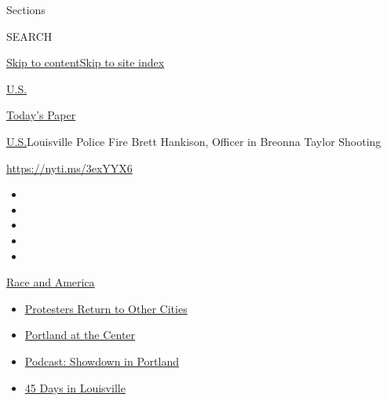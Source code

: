 Sections

SEARCH

\protect\hyperlink{site-content}{Skip to
content}\protect\hyperlink{site-index}{Skip to site index}

\href{https://www.nytimes3xbfgragh.onion/section/us}{U.S.}

\href{https://myaccount.nytimes3xbfgragh.onion/auth/login?response_type=cookie\&client_id=vi}{}

\href{https://www.nytimes3xbfgragh.onion/section/todayspaper}{Today's
Paper}

\href{/section/us}{U.S.}\textbar{}Louisville Police Fire Brett Hankison,
Officer in Breonna Taylor Shooting

\url{https://nyti.ms/3exYYX6}

\begin{itemize}
\item
\item
\item
\item
\item
\end{itemize}

\href{https://www.nytimes3xbfgragh.onion/news-event/george-floyd-protests-minneapolis-new-york-los-angeles?action=click\&pgtype=Article\&state=default\&region=TOP_BANNER\&context=storylines_menu}{Race
and America}

\begin{itemize}
\tightlist
\item
  \href{https://www.nytimes3xbfgragh.onion/2020/07/26/us/protests-portland-seattle-trump.html?action=click\&pgtype=Article\&state=default\&region=TOP_BANNER\&context=storylines_menu}{Protesters
  Return to Other Cities}
\item
  \href{https://www.nytimes3xbfgragh.onion/2020/07/24/us/portland-oregon-protests-white-race.html?action=click\&pgtype=Article\&state=default\&region=TOP_BANNER\&context=storylines_menu}{Portland
  at the Center}
\item
  \href{https://www.nytimes3xbfgragh.onion/2020/07/23/podcasts/the-daily/portland-protests.html?action=click\&pgtype=Article\&state=default\&region=TOP_BANNER\&context=storylines_menu}{Podcast:
  Showdown in Portland}
\item
  \href{https://www.nytimes3xbfgragh.onion/interactive/2020/07/16/us/black-lives-matter-protests-louisville-breonna-taylor.html?action=click\&pgtype=Article\&state=default\&region=TOP_BANNER\&context=storylines_menu}{45
  Days in Louisville}
\end{itemize}

